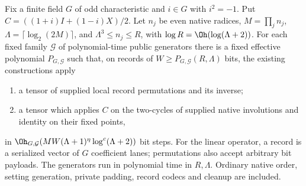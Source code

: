 \begin{paperlemma}
\label{lem:oddgroupedservice}
Fix a finite field $G$ of odd characteristic and $i\in G$ with $i^2=-1$.
Put $C=((1+i)I+(1-i)X)/2$. Let $n_j$ be even native radices,
$M=\prod_j n_j$, $\Lambda=\lceil\log_2(2M)\rceil$, and
$\Lambda^3\le n_j\le R$, with $\log R=\Oh(\log(\Lambda+2))$.
For each fixed family $\mathcal G$ of polynomial-time public generators
there is a fixed effective polynomial $P_{G,\mathcal G}$ such that,
on records of $W\ge P_{G,\mathcal G}(R,\Lambda)$ bits, the existing
constructions apply
\begin{enumerate}
\item a tensor of supplied local record permutations and its inverse;
\item a tensor which applies $C$ on the two-cycles of supplied native
involutions and identity on their fixed points,
\end{enumerate}
in $\Oh_{G,\mathcal G}(MW(\Lambda+1)^\eta\log^c(\Lambda+2))$ bit steps.
For the linear operator, a record is a serialized vector of $G$
coefficient lanes; permutations also accept arbitrary bit payloads.
The generators run in polynomial time in $R,\Lambda$.
Ordinary native order, setting generation, private
padding, record codecs and cleanup are included.
\end{paperlemma}
